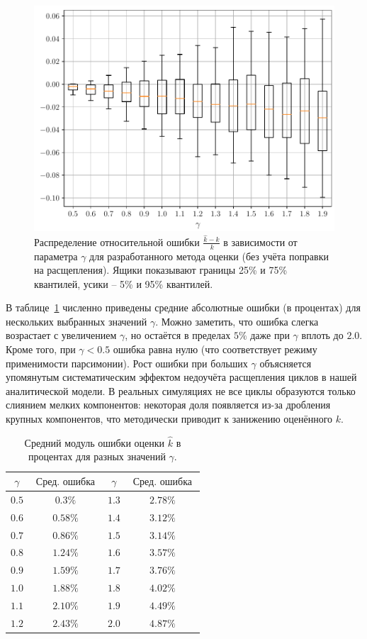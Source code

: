 \begin{figure}[h!]
    \centering
    \includegraphics[width=0.8\linewidth]{images/part2/dir_est_05_20.pdf}
    \caption{Распределение относительной ошибки $\frac{\hat{k} - k}{\,k}$ в зависимости от параметра $\gamma$ для разработанного метода оценки (без учёта поправки на расщепления). Ящики показывают границы 25\% и 75\% квантилей, усики – 5\% и 95\% квантилей.}
    \label{dir_est_05_20}
\end{figure}

В таблице~\ref{tab-est-error} численно приведены средние абсолютные ошибки (в процентах) для нескольких выбранных значений $\gamma$. Можно заметить, что ошибка слегка возрастает с увеличением $\gamma$, но остаётся в пределах $5\%$ даже при $\gamma$ вплоть до $2.0$. Кроме того, при $\gamma < 0.5$ ошибка равна нулю (что соответствует режиму применимости парсимонии). Рост ошибки при больших $\gamma$ объясняется упомянутым систематическим эффектом недоучёта расщепления циклов в нашей аналитической модели. В реальных симуляциях не все циклы образуются только слиянием мелких компонентов: некоторая доля появляется из-за дробления крупных компонентов, что методически приводит к занижению оценённого $k$.

\begin{table}[!h]
  \caption{Средний модуль ошибки оценки $\hat{k}$ в процентах для разных значений $\gamma$.}
  \label{tab-est-error}
  \centering
  \begin{tabular}{|c|c||c|c|}
    \hline 
    $\gamma$ & $\;\text{Сред. ошибка}\;$ & $\gamma$ & $\;\text{Сред. ошибка}\;$ \\
    \hline
    $0.5$ & $0.3\%$ & $1.3$ & $2.78\%$ \\
    $0.6$ & $0.58\%$ & $1.4$ & $3.12\%$ \\
    $0.7$ & $0.86\%$ & $1.5$ & $3.14\%$ \\
    $0.8$ & $1.24\%$ & $1.6$ & $3.57\%$ \\
    $0.9$ & $1.59\%$ & $1.7$ & $3.76\%$ \\
    $1.0$ & $1.88\%$ & $1.8$ & $4.02\%$ \\
    $1.1$ & $2.10\%$ & $1.9$ & $4.49\%$ \\
    $1.2$ & $2.43\%$ & $2.0$ & $4.87\%$ \\
    \hline
  \end{tabular}
\end{table}

